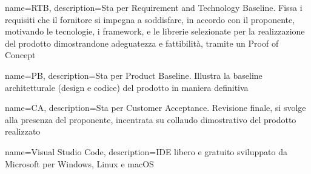 {
	name={RTB},
	description={Sta per Requirement and Technology Baseline. Fissa i requisiti che il fornitore si impegna a soddisfare, in accordo con il proponente, motivando le tecnologie, i framework, e le librerie selezionate per la realizzazione del prodotto dimostrandone adeguatezza e fattibilità, tramite un Proof of Concept}
}

{
	name={PB},
	description={Sta per Product Baseline. Illustra la baseline architetturale (design e codice) del prodotto in maniera definitiva}
}

{
	name={CA},
	description={Sta per Customer Acceptance. Revisione finale, si svolge alla presenza del proponente, incentrata su collaudo dimostrativo del prodotto realizzato}
}

{
	name={Visual Studio Code},
	description={IDE\glo{} libero e gratuito sviluppato da Microsoft per Windows, Linux e macOS}
}

